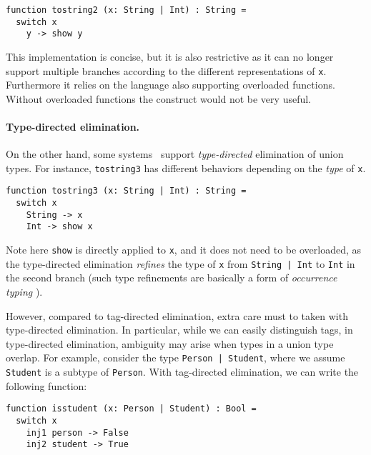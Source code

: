 \begin{lstlisting}
function tostring2 (x: String | Int) : String =
  switch x
    y -> show y
\end{lstlisting}

This implementation is concise, but it is also restrictive as it can no longer
support multiple branches according to the different representations of
\lstinline{x}. Furthermore it relies on the language also supporting overloaded
functions. Without overloaded functions the construct would not be very useful.

\paragraph{Type-directed elimination.}

On the other hand, some
systems~\cite{castagna:settheoretic,muehlboeck2018empowering} support
\textit{type-directed} elimination of union types. For instance,
\lstinline{tostring3} has different behaviors depending on the \textit{type} of
\lstinline{x}.

\begin{lstlisting}
function tostring3 (x: String | Int) : String =
  switch x
    String -> x
    Int -> show x
\end{lstlisting}

\noindent Note here \lstinline{show} is directly applied to \lstinline{x}, and
it does not need to be overloaded, as the type-directed elimination
\textit{refines} the type of \lstinline{x} from \lstinline{String | Int} to
\lstinline{Int} in the second branch (such type refinements are basically a form of
\textit{occurrence typing} \cite{Tobin:typedscheme}).

However, compared to tag-directed elimination, extra care must to taken with
type-directed elimination. In particular, while we can easily distinguish tags,
in type-directed elimination, ambiguity may arise when types in a union type
overlap. For example, consider the type \lstinline{Person | Student}, where we
assume \lstinline{Student} is a subtype of \lstinline{Person}. With tag-directed
elimination, we can write the following function:

\begin{lstlisting}
function isstudent (x: Person | Student) : Bool =
  switch x
    inj1 person -> False
    inj2 student -> True
\end{lstlisting}

